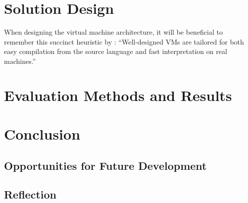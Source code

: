 \chapter{Solution Design}
	When designing the virtual machine architecture, it will be beneficial to remember this succinct heuristic by \cite{structureinterpreters}: ``Well-designed VMs are tailored for both easy compilation from the source language and fast interpretation on real machines.''

\chapter{Evaluation Methods and Results}

\chapter{Conclusion}
	
	\section{Opportunities for Future Development}
	
	\section{Reflection}

\bibliographysection

